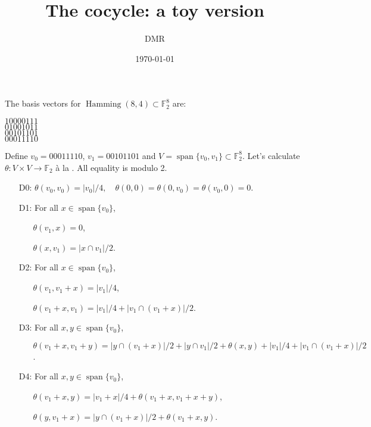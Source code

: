 \documentclass[nobib,a4paper,debug]{tufte-handout}
\title{The cocycle: a toy version}
\date{\today}
\author{DMR}
\DeclareMathOperator{\Hamming}{Hamming}
\DeclareMathOperator{\Span}{span}
\newcommand{\F}{\mathbb{F}}
\begin{document}
\maketitle

\noindent 
The basis vectors for $\Hamming(8,4)\subset \F_2^8$ are:\\
\begin{center}
$10000111$\\
$01001011$\\
$00101101$\\
$00011110$
\end{center}
Define $v_0 = 00011110$, $v_1=00101101$ and $V = \Span\{v_0,v_1\}\subset \F_2^8$.
Let's calculate $\theta\colon V\times V \to \F_2$
\`a la \cite[Theorem 10]{Griess}. All equality is modulo 2.

\begin{itemize}

	\item[D0:] $\theta(v_0,v_0) = |v_0|/4,\quad \theta(0,0) = \theta(0,v_0) = \theta(v_0,0) = 0$.

	\item[D1:] For all $x \in \Span\{v_0\}$, 
	\begin{itemize}
		\item[] $\theta(v_1,x) = 0$, 
		\item[] $\theta(x,v_1) = |x\cap v_1|/2$.
	\end{itemize}

	\item[D2:] For all $x \in \Span\{v_0\}$,
	\begin{itemize}
	 	\item[] $\theta(v_1,v_1+x) = |v_1|/4$,
	 	\item[] $\theta(v_1 + x,v_1) = |v_1|/4 + |v_1\cap(v_1+x)|/2$.
	 \end{itemize} 
	 \item[D3:] For all $x,y\in \Span\{v_0\}$,
	 \begin{itemize}
	 	\item[] $\theta(v_1+x,v_1+y) = |y\cap(v_1+x)|/2 + |y\cap v_1|/2 + \theta(x,y) + |v_1|/4 + |v_1\cap(v_1+x)|/2$.
	 \end{itemize}
	 \item[D4:] For all $x,y\in \Span\{v_0\}$,
	 \begin{itemize}
	 	\item[] $\theta(v_1+x,y) = |v_1+x|/4 + \theta(v_1+x,v_1+x+y)$,
	 	\item[] $\theta(y,v_1+x) = |y\cap(v_1+x)|/2 + \theta(v_1+x,y)$.
	 \end{itemize}

\end{itemize}
\end{document}
